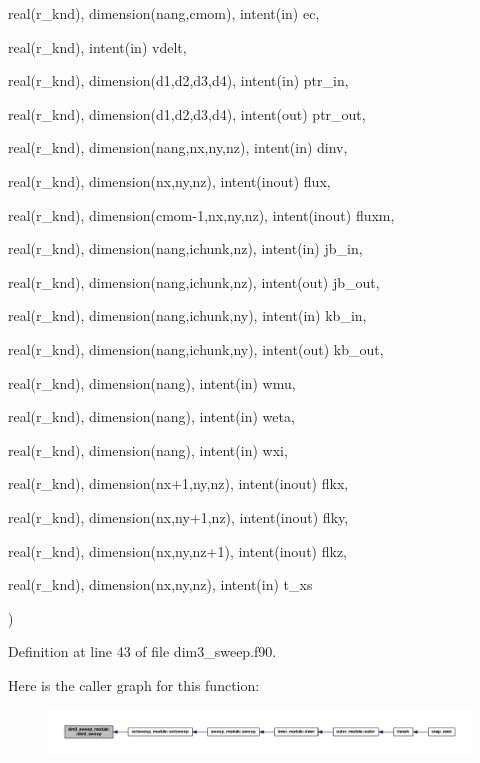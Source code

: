 {{\begin{DoxyParamCaption}
\item[{real(r\-\_\-knd), dimension(nang,cmom), intent(in)}]{ec, }
\item[{real(r\-\_\-knd), intent(in)}]{vdelt, }
\item[{real(r\-\_\-knd), dimension(d1,d2,d3,d4), intent(in)}]{ptr\-\_\-in, }
\item[{real(r\-\_\-knd), dimension(d1,d2,d3,d4), intent(out)}]{ptr\-\_\-out, }
\item[{real(r\-\_\-knd), dimension(nang,nx,ny,nz), intent(in)}]{dinv, }
\item[{real(r\-\_\-knd), dimension(nx,ny,nz), intent(inout)}]{flux, }
\item[{real(r\-\_\-knd), dimension(cmom-\/1,nx,ny,nz), intent(inout)}]{fluxm, }
\item[{real(r\-\_\-knd), dimension(nang,ichunk,nz), intent(in)}]{jb\-\_\-in, }
\item[{real(r\-\_\-knd), dimension(nang,ichunk,nz), intent(out)}]{jb\-\_\-out, }
\item[{real(r\-\_\-knd), dimension(nang,ichunk,ny), intent(in)}]{kb\-\_\-in, }
\item[{real(r\-\_\-knd), dimension(nang,ichunk,ny), intent(out)}]{kb\-\_\-out, }
\item[{real(r\-\_\-knd), dimension(nang), intent(in)}]{wmu, }
\item[{real(r\-\_\-knd), dimension(nang), intent(in)}]{weta, }
\item[{real(r\-\_\-knd), dimension(nang), intent(in)}]{wxi, }
\item[{real(r\-\_\-knd), dimension(nx+1,ny,nz), intent(inout)}]{flkx, }
\item[{real(r\-\_\-knd), dimension(nx,ny+1,nz), intent(inout)}]{flky, }
\item[{real(r\-\_\-knd), dimension(nx,ny,nz+1), intent(inout)}]{flkz, }
\item[{real(r\-\_\-knd), dimension(nx,ny,nz), intent(in)}]{t\-\_\-xs}
\end{DoxyParamCaption}
)}}\label{classdim3__sweep__module_a201ea00518f54fac4152d4ce277de50d}


Definition at line 43 of file dim3\-\_\-sweep.\-f90.



Here is the caller graph for this function\-:\nopagebreak
\begin{figure}[H]
\begin{center}
\leavevmode
\includegraphics[width=350pt]{classdim3__sweep__module_a201ea00518f54fac4152d4ce277de50d_icgraph}
\end{center}
\end{figure}




